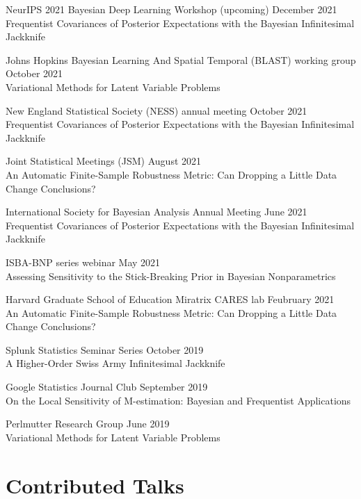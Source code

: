 \documentclass[margin,line]{res}
\begin{document}
\begin{resume}
NeurIPS 2021 Bayesian Deep Learning Workshop
\hfill (upcoming) December 2021 \\
Frequentist Covariances of Posterior Expectations
with the Bayesian Infinitesimal Jackknife


Johns Hopkins Bayesian Learning And Spatial Temporal (BLAST) working group
\hfill October 2021\\
Variational Methods for Latent Variable Problems

New England Statistical Society (NESS) annual meeting
\hfill October 2021\\
Frequentist Covariances of Posterior Expectations
with the Bayesian Infinitesimal Jackknife

Joint Statistical Meetings (JSM)
\hfill August 2021\\
An Automatic Finite-Sample Robustness Metric: Can Dropping a Little Data
Change Conclusions?

International Society for Bayesian Analysis Annual Meeting
\hfill June 2021\\
Frequentist Covariances of Posterior Expectations
with the Bayesian Infinitesimal Jackknife

ISBA-BNP series webinar %
\hfill May 2021\\
Assessing Sensitivity to the Stick-Breaking Prior in Bayesian Nonparametrics

Harvard Graduate School of Education Miratrix CARES lab
\hfill Feubruary 2021\\
An Automatic Finite-Sample Robustness Metric: Can Dropping a Little Data
Change Conclusions?

Splunk Statistics Seminar Series \hfill October 2019\\
A Higher-Order Swiss Army Infinitesimal Jackknife

Google Statistics Journal Club \hfill September 2019\\
On the Local Sensitivity of M-estimation: Bayesian and Frequentist Applications

Perlmutter Research Group \hfill June 2019 \\
Variational Methods for Latent Variable Problems



\section{\sc Contributed Talks}


\end{resume}
\end{document}
